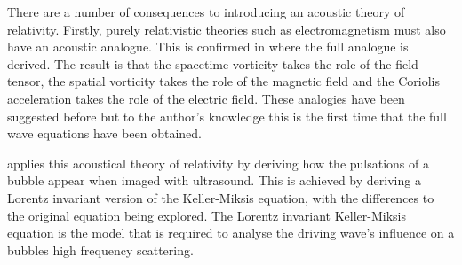 There are a number of consequences to introducing an acoustic theory of relativity.
Firstly, purely relativistic theories such as electromagnetism must also have an acoustic analogue.
This is confirmed in  where the full analogue is derived.
The result is that the spacetime vorticity takes the role of the field tensor,
the spatial vorticity takes the role of the magnetic field and the Coriolis acceleration takes the role of the electric field.
These analogies have been suggested before\cite{Marmanis2000,Sridhar1998} but 
to the author's knowledge this is the first time that the full wave equations have been obtained. 

 applies this acoustical theory of relativity by deriving how the pulsations of a bubble appear when imaged with ultrasound.
This is achieved by deriving a  Lorentz invariant version of the Keller-Miksis equation,
with the 
differences to the original equation being explored.
The Lorentz invariant Keller-Miksis equation is the model that is required 
to analyse the driving wave's influence on a bubbles high frequency scattering.

